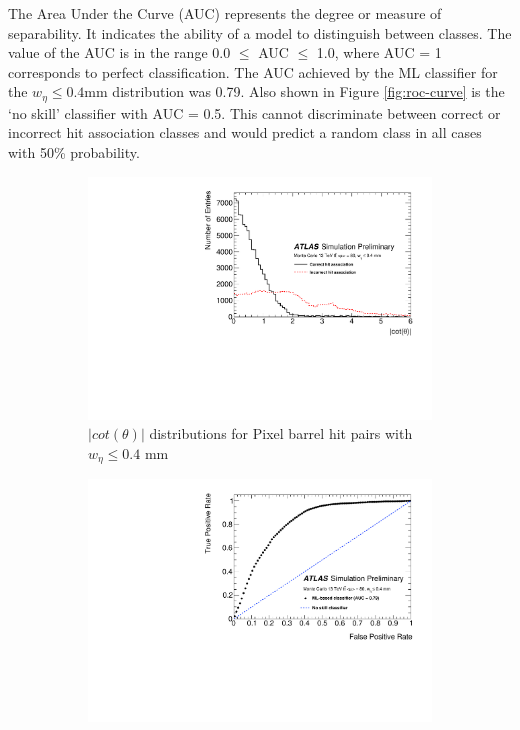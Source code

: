 The Area Under the Curve (AUC) represents the degree or measure of separability. It indicates the ability of a model to distinguish between classes. The value of the AUC is in the range 0.0 $\leq$ AUC $\leq$ 1.0, where AUC = 1 corresponds to perfect classification. The AUC achieved by the ML classifier for the $w_{\eta} \leq 0.4$mm distribution was 0.79. Also shown in Figure \ref{fig:roc-curve} is the ‘no skill’ classifier with AUC = 0.5. This cannot discriminate between correct or incorrect hit association classes and would predict a random class in all cases with 50\% probability.


\begin{figure}[!htbp]
\centering
    \begin{subfigure}[a]{0.9\textwidth}
        \includegraphics[width=\linewidth]{images/4-ml-based-predictor/histo.pdf}
        \caption{$\lvert cot(\theta) \rvert$ distributions for Pixel barrel hit pairs with $w_{\eta} \leq 0.4$ mm }
        \label{fig:truth-histo}
    \end{subfigure}
    \hfill
    \begin{subfigure}[b]{0.9\textwidth}
        \centering
        \includegraphics[width=\linewidth]{images/4-ml-based-predictor/roc.pdf}

\end{subfigure}
\end{figure}
